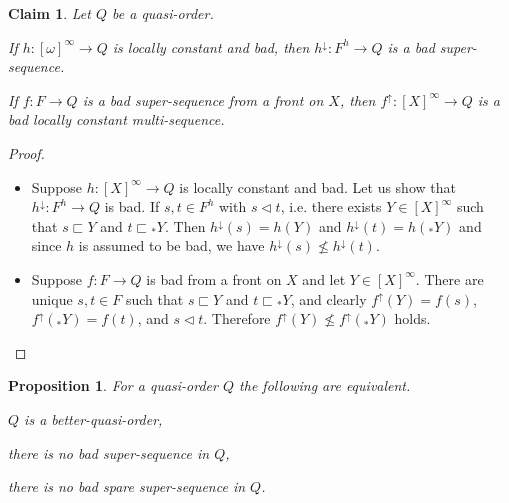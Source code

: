 \documentclass{article}%
\theoremstyle{plain}
\newtheorem{proposition}[theorem]{Proposition}
\newtheorem{lemma}[theorem]{Properties}
\newtheorem{lemma}[theorem]{Lemma}
\newtheorem{lemma}[theorem]{Fact}
\newtheorem{lemma}[theorem]{Facts}
\newtheorem{lemma}{Claim}
\theoremstyle{definition}
\theoremstyle{remark}
\DeclareMathOperator{\upcl}{\uparrow}
\DeclareMathOperator{\dcl}{\downarrow}
\newcommand{\segs} {\sqsubset}
\newcommand{\tri} {\mathrel{\lhd}}
\newcommand{\shift}[1]{{}_{*}#1}
\newcommand{\infSub}[1]{[#1]^{\infty}}
\begin{document}
 \begin{lemma}\label{badSimpsonNW}
 Let $Q$ be a quasi-order. 
 \begin{enumThm}
 \item If $h:\infSub{\omega}\to Q$ is locally constant and bad, then $h^{\dcl}:F^{h}\to Q$ is a bad super-sequence. \label{badSimpsonNW1}
 \item If $f:F\to Q$ is a bad super-sequence from a front on $X$, then $f^{\upcl}:\infSub{X}\to Q$ is a bad locally constant multi-sequence.\label{badSimpsonNW2}
 \end{enumThm}
 \end{lemma}
\begin{proof}
\begin{itemize} 
\item[\cref{badSimpsonNW1}] Suppose $h:\infSub{X}\to Q$ is locally constant and bad. Let us show that $h^{\dcl}:F^{h}\to Q$ is bad. If $s,t\in F^{h}$ with $s\tri t$, i.e. there exists $Y\in\infSub{X}$ such that $s\segs Y$ and $t\segs \shift{Y}$. Then $h^{\dcl}(s)=h(Y)$ and $h^{\dcl}(t)=h(\shift{Y})$ and since $h$ is assumed to be bad, we have $h^{\dcl}(s)\nleq h^{\dcl}(t)$.
 
\item[\cref{badSimpsonNW2}] Suppose $f:F\to Q$ is bad from a front on $X$ and let $Y\in\infSub{X}$. There are unique $s,t\in F$ such that $s\segs Y$ and $t\segs \shift{Y}$, and clearly $f^{\upcl}(Y)=f(s)$, $f^{\upcl}(\shift{Y})=f(t)$, and $s\tri t$. Therefore $f^{\upcl}(Y)\nleq f^{\upcl}(\shift{Y})$ holds. \qedhere
\end{itemize}
 \end{proof}	
  

 
 \begin{proposition}\label{cor WlogSpare}
For a quasi-order $Q$ the following are equivalent.
\begin{enumThm}
\item $Q$ is a better-quasi-order,
\item there is no bad super-sequence in $Q$,
\item there is no bad spare super-sequence in $Q$.
\end{enumThm}
 \end{proposition}
\end{document}

